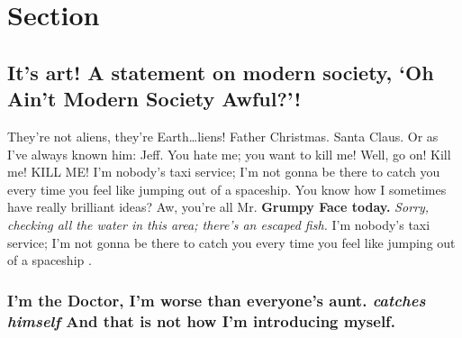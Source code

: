 \label{chapter-3}

\section{Section}\label{section-3.1}

\subsection{\texorpdfstring{It's art! A statement on modern society, `Oh
Ain't Modern Society
Awful?'!}{It's art! A statement on modern society, Oh Ain't Modern Society Awful?!}}\label{its-art-a-statement-on-modern-society-oh-aint-modern-society-awful}

They're not aliens, they're Earth\ldots{}liens! Father Christmas. Santa
Claus. Or as I've always known him: Jeff. You hate me; you want to kill
me! Well, go on! Kill me! KILL ME! I'm nobody's taxi service; I'm not
gonna be there to catch you every time you feel like jumping out of a
spaceship. You know how I sometimes have really brilliant ideas? Aw,
you're all Mr. \textbf{Grumpy Face today.} \emph{Sorry, checking all the
water in this area; there's an escaped fish.} I'm nobody's taxi service;
I'm not gonna be there to catch you every time you feel like jumping out
of a spaceship .



\subsubsection{\texorpdfstring{I'm the Doctor, I'm worse than everyone's
aunt. \emph{catches himself} And that is not how I'm introducing
myself.}{I'm the Doctor, I'm worse than everyone's aunt. catches himself And that is not how I'm introducing myself.}}\label{im-the-doctor-im-worse-than-everyones-aunt.-catches-himself-and-that-is-not-how-im-introducing-myself.}

